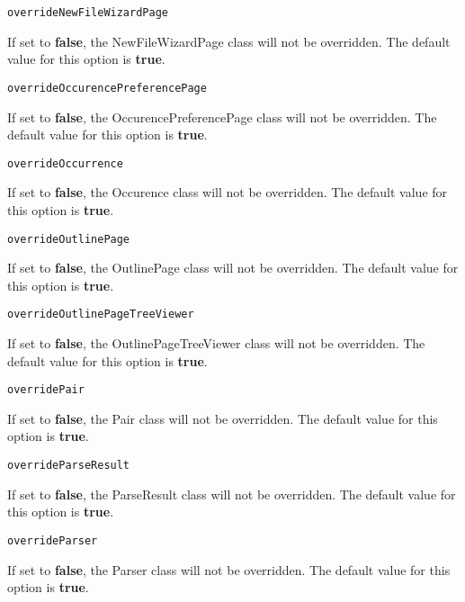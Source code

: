 \noindent\texttt{overrideNewFileWizardPage}
\begin{myindentpar}{1cm}
If set to \textbf{false}, the NewFileWizardPage class will not be overridden. The default value for this option is \textbf{true}.
\end{myindentpar}

\noindent\texttt{overrideOccurencePreferencePage}
\begin{myindentpar}{1cm}
If set to \textbf{false}, the OccurencePreferencePage class will not be overridden. The default value for this option is \textbf{true}.
\end{myindentpar}

\noindent\texttt{overrideOccurrence}
\begin{myindentpar}{1cm}
If set to \textbf{false}, the Occurence class will not be overridden. The default value for this option is \textbf{true}.
\end{myindentpar}

\noindent\texttt{overrideOutlinePage}
\begin{myindentpar}{1cm}
If set to \textbf{false}, the OutlinePage class will not be overridden. The default value for this option is \textbf{true}.
\end{myindentpar}

\noindent\texttt{overrideOutlinePageTreeViewer}
\begin{myindentpar}{1cm}
If set to \textbf{false}, the OutlinePageTreeViewer class will not be overridden. The default value for this option is \textbf{true}.
\end{myindentpar}

\noindent\texttt{overridePair}
\begin{myindentpar}{1cm}
If set to \textbf{false}, the Pair class will not be overridden. The default value for this option is \textbf{true}.
\end{myindentpar}

\noindent\texttt{overrideParseResult}
\begin{myindentpar}{1cm}
If set to \textbf{false}, the ParseResult class will not be overridden. The default value for this option is \textbf{true}.
\end{myindentpar}

\noindent\texttt{overrideParser}
\begin{myindentpar}{1cm}
If set to \textbf{false}, the Parser class will not be overridden. The default value for this option is \textbf{true}.
\end{myindentpar}

